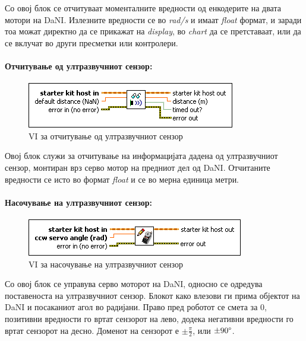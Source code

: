 \documentclass[12pt]{article}
\begin{document}
			Со овој блок се отчитуваат моменталните вредности од енкодерите на двата мотори на DaNI. Излезните вредности се во \textit{rad/s} и имаат \textit{float} формат, и заради тоа можат директно да се прикажат на \textit{display}, во \textit{chart} да се претставаат, или да се вклучат во други пресметки или контролери.

    \paragraph{Отчитување од ултразвучниот сензор:\\}
      \begin{figure}[H]
				\includegraphics[width=0.45\linewidth]{./images/read_ping.png}
				\raggedright
				\caption{VI за отчитување од ултразвучниот сензор}
				\label{fig:read_ping.png}
				\end{figure}

			Овој блок служи за отчитување на информацијата дадена од ултразвучниот сензор, монтиран врз серво мотор на предниот дел од DaNI. Отчитаните вредности се исто во формат \textit{float} и се во мерна единица метри.

    \paragraph{Насочување на ултразвучниот сензор:\\}
			\begin{figure}[H]
				\includegraphics[width=0.45\linewidth]{./images/write_servo.png}
				\caption{VI за насочување на ултразвучниот сензор}
				\label{fig:write_servo.png}
				\raggedright
				\end{figure}
			Со овој блок се управува серво моторот на DaNI, односно се одредува поставеноста на ултразвучниот сензор. Блокот како влезови ги прима објектот на DaNI и посаканиот агол во радијани. Право пред роботот се смета за 0, позитивни вредности го вртат сензорот на лево, додека негативни вредности го вртат сензорот на десно. Доменот на сензорот е $ \pm \frac{\pi}{2}$, или $\pm 90 \degree$.

\newpage

\end{document}
